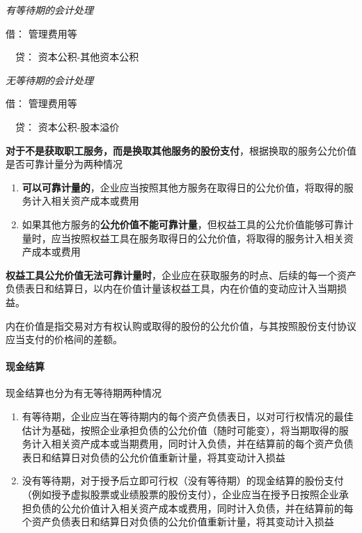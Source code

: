 \documentclass[UTF8,12pt]{ctexart}
\newenvironment{Dr}{\noindent 借：}{\par}
\newenvironment{Cr}{\noindent \ \ 贷：}{\par}
\numberwithin{equation}{section} %
\numberwithin{figure}{section}
\numberwithin{table}{section}
\begin{document}
	\textit{有等待期的会计处理}
	
	\begin{Dr}
		管理费用等
	\end{Dr}
	\begin{Cr}
		资本公积-其他资本公积
	\end{Cr}

	\textit{无等待期的会计处理}
	
	\begin{Dr}
		管理费用等
	\end{Dr}
	\begin{Cr}
		资本公积-股本溢价
	\end{Cr}

	\textbf{对于不是获取职工服务，而是换取其他服务的股份支付}，根据换取的服务公允价值是否可靠计量分为两种情况
	\begin{enumerate}
		\item \textbf{可以可靠计量的}，企业应当按照其他方服务在取得日的公允价值，将取得的服务计入相关资产成本或费用
		
		\item 如果其他方服务的\textbf{公允价值不能可靠计量}，但权益工具的公允价值能够可靠计量时，应当按照权益工具在服务取得日的公允价值，将取得的服务计入相关资产成本或费用
	\end{enumerate}

	\textbf{权益工具公允价值无法可靠计量时}，企业应在获取服务的时点、后续的每一个资产负债表日和结算日，以内在价值计量该权益工具，内在价值的变动应计入当期损益。
	
	内在价值是指交易对方有权认购或取得的股份的公允价值，与其按照股份支付协议应当支付的价格间的差额。
	
	\paragraph{现金结算}
	
	现金结算也分为有无等待期两种情况
	
	\begin{enumerate}
		\item 有等待期，企业应当在等待期内的每个资产负债表日，以对可行权情况的最佳估计为基础，按照企业承担负债的公允价值（随时可能变），将当期取得的服务计入相关资产成本或当期费用，同时计入负债，并在结算前的每个资产负债表日和结算日对负债的公允价值重新计量，将其变动计入损益
		
		\item 没有等待期，对于授予后立即可行权（没有等待期）的现金结算的股份支付（例如授予虚拟股票或业绩股票的股份支付），企业应当在授予日按照企业承担负债的公允价值计入相关资产成本或费用，同时计入负债，并在结算前的每个资产负债表日和结算日对负债的公允价值重新计量，将其变动计入损益
	\end{enumerate}
	
\end{document}
